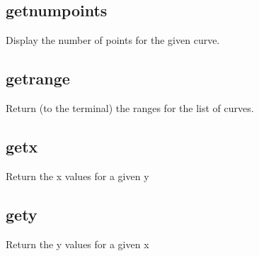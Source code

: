 \documentclass[letterpaper,10pt,english]{sphinxmanual}
\begin{document}
\begin{sphinxVerbatim}[commandchars=\\\{\}]
\PYG{p}{[}\PYG{p}{]}  
\end{sphinxVerbatim}


\subsection{getnumpoints}
\label{\detokenize{curve_inquiry_cmds:getnumpoints}}
Display the number of points for the given curve.

\begin{sphinxVerbatim}[commandchars=\\\{\}]
\PYG{p}{[}\PYG{p}{]}  
\end{sphinxVerbatim}


\subsection{getrange}
\label{\detokenize{curve_inquiry_cmds:getrange}}
Return (to the terminal) the ranges for the list of curves.

\begin{sphinxVerbatim}[commandchars=\\\{\}]
\PYG{p}{[}\PYG{p}{]}  
\end{sphinxVerbatim}


\subsection{getx}
\label{\detokenize{curve_inquiry_cmds:getx}}
Return the x values for a given y

\begin{sphinxVerbatim}[commandchars=\\\{\}]
\PYG{p}{[}\PYG{p}{]}   
\end{sphinxVerbatim}


\subsection{gety}
\label{\detokenize{curve_inquiry_cmds:gety}}
Return the y values for a given x
\end{document}
